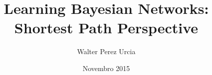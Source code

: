 \title[BN Learning]{Learning Bayesian Networks: Shortest Path Perspective}

\author[W. Perez]{Walter Perez Urcia}

\date[2015]{Novembro 2015}

\begin{frame}
	\titlepage
\end{frame}